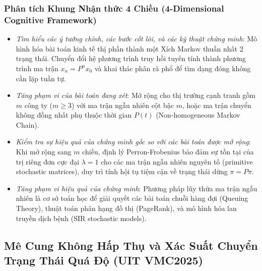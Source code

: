 \documentclass{article}
\begin{document}
\subsubsection*{Phân tích Khung Nhận thức 4 Chiều (4-Dimensional Cognitive Framework)}
\begin{itemize}
	\item \textit{Tìm hiểu các ý tưởng chính, các bước cốt lõi, và các kỹ thuật chứng minh}: Mô hình hóa bài toán kinh tế thị phần thành một Xích Markov thuần nhất 2 trạng thái. Chuyển đổi hệ phương trình truy hồi tuyến tính thành phương trình ma trận $x_n = P^n x_0$ và khai thác phân rã phổ để tìm dạng đóng không cần lặp tuần tự.
	\item \textit{Tăng phạm vi của bài toán đang xét}: Mở rộng cho thị trường cạnh tranh gồm $m$ công ty ($m \ge 3$) với ma trận ngẫu nhiên cột bậc $m$, hoặc ma trận chuyển không đồng nhất phụ thuộc thời gian $P(t)$ (Non-homogeneous Markov Chain).
	\item \textit{Kiểm tra sự hiệu quả của chứng minh gốc so với các bài toán được mở rộng}: Khi mở rộng sang $m$ chiều, định lý Perron-Frobenius bảo đảm sự tồn tại của trị riêng đơn cực đại $\lambda = 1$ cho các ma trận ngẫu nhiên nguyên tố (primitive stochastic matrices), duy trì tính hội tụ tiệm cận về trạng thái dừng $\pi = P\pi$.
	\item \textit{Tăng phạm vi hiệu quả của chứng minh}: Phương pháp lũy thừa ma trận ngẫu nhiên là cơ sở toán học để giải quyết các bài toán chuỗi hàng đợi (Queuing Theory), thuật toán phân hạng đồ thị (PageRank), và mô hình hóa lan truyền dịch bệnh (SIR stochastic models).
\end{itemize}


\subsection{Mê Cung Không Hấp Thụ và Xác Suất Chuyển Trạng Thái Quá Độ (UIT VMC2025)}
\end{document}
